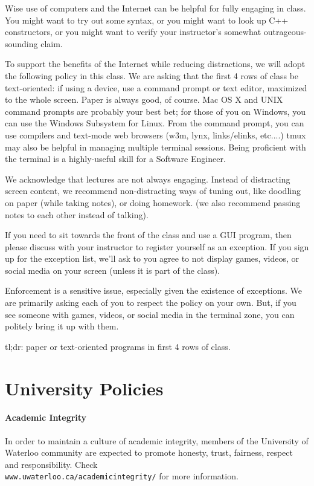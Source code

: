 \documentclass[letterpaper,10pt]{article}
\begin{document}
Wise use of computers and the Internet can be helpful for fully
engaging in class. You might want to try out some syntax, or you might
want to look up C++ constructors, or you might want to verify your
instructor's somewhat outrageous-sounding claim.

To support the benefits of the Internet while reducing distractions,
we will adopt the following policy in this class. We are asking that the
first 4 rows of class be text-oriented: if using a device, use a
command prompt or text editor, maximized to the whole screen. Paper is
always good, of course. Mac OS X and UNIX command prompts are probably
your best bet; for those of you on Windows, you can use the Windows
Subsystem for Linux. From the command prompt, you can use compilers
and text-mode web browsers (w3m, lynx, links/elinks, etc....) tmux may
also be helpful in managing multiple terminal sessions. Being
proficient with the terminal is a highly-useful skill for a Software
Engineer.

We acknowledge that lectures are not always engaging. Instead of
distracting screen content, we recommend non-distracting ways of tuning
out, like doodling on paper (while taking notes), or doing homework.
(we also recommend passing notes to each other instead of talking).

If you need to sit towards the front of the class and use a GUI
program, then please discuss with your instructor to register
yourself as an exception. If you sign up for
the exception list, we'll ask to you agree to not display games,
videos, or social media on your screen (unless it is part of the
class).

Enforcement is a sensitive issue, especially given the existence of
exceptions. We are primarily asking each of you to respect the policy
on your own. But, if you see someone with games, videos, or social
media in the terminal zone, you can politely bring it up with them.

tl;dr: paper or text-oriented programs in first 4 rows of class.

\section*{University Policies}

\paragraph{Academic Integrity}
In order to maintain a culture of academic integrity, members of the University of Waterloo community are expected to promote honesty, trust, fairness, respect and responsibility. Check\\
\texttt{www.uwaterloo.ca/academicintegrity/} for more information.
\end{document}
